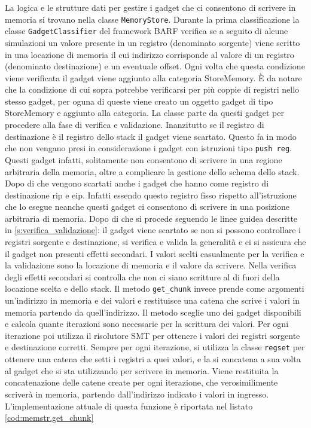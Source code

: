 La logica e le strutture dati per gestire i gadget che ci consentono
di scrivere in memoria si trovano nella classe
\lstinline{MemoryStore}.  Durante la prima classificazione la classe
\lstinline{GadgetClassifier} del framework BARF verifica se a seguito
di alcune simulazioni un valore presente in un registro (denominato
sorgente) viene scritto in una locazione di memoria il cui indirizzo
corrisponde al valore di un registro (denominato destinazione) e un
eventuale offset. Ogni volta che questa condizione viene verificata il
gadget viene aggiunto alla categoria StoreMemory. È da notare che la
condizione di cui sopra potrebbe verificarsi per più coppie di
registri nello stesso gadget, per oguna di queste viene creato un
oggetto gadget di tipo StoreMemory e aggiunto alla categoria. La
classe parte da questi gadget per procedere alla fase di verifica e
validazione. Inanzitutto se il registro di destinazione è il registro
dello stack il gadget viene scartato. Questo fa in modo che non
vengano presi in considerazione i gadget con istruzioni tipo
\lstinline{push reg}. Questi gadget infatti, solitamente non
consentono di scrivere in una regione arbitraria della memoria, oltre
a complicare la gestione dello schema dello stack. Dopo di che vengono
scartati anche i gadget che hanno come registro di destinazione rip e
eip. Infatti essendo questo registro fisso rispetto all'istruzione che
lo esegue neanche questi gadget ci consentono di scrivere in una
posizione arbitraria di memoria. Dopo di che si procede seguendo le
linee guidea descritte in \ref{s:verifica_validazione}: il gadget
viene scartato se non si possono controllare i registri sorgente e
destinazione, si verifica e valida la generalità e ci si assicura che
il gadget non presenti effetti secondari. I valori scelti casualmente
per la verifica e la validazione sono la locazione di memoria e il
valore da scrivere. Nella verifica degli effetti secondari si
controlla che non ci siano scritture al di fuori della locazione
scelta e dello stack. Il metodo \lstinline{get_chunk} invece prende
come argomenti un'indirizzo in memoria e dei valori e restituisce una
catena che scrive i valori in memoria partendo da quell'indirizzo. Il
metodo sceglie uno dei gadget disponibili e calcola quante iterazioni
sono necessarie per la scrittura dei valori. Per ogni iterazione poi
utilizza il risolutore SMT per ottenere i valori dei registri sorgente
e destinazione corretti. Sempre per ogni iterazione, si utilizza la
classe \lstinline{regset} per ottenere una catena che setti i registri
a quei valori, e la si concatena a sua volta al gadget che si sta
utilizzando per scrivere in memoria. Viene restituita la
concatenazione delle catene create per ogni iterazione, che
verosimilimente scriverà in memoria, partendo dall'indirizzo indicato
i valori in ingresso. L'implementazione attuale di questa funzione è
riportata nel listato \ref{cod:memstr.get_chunk}

